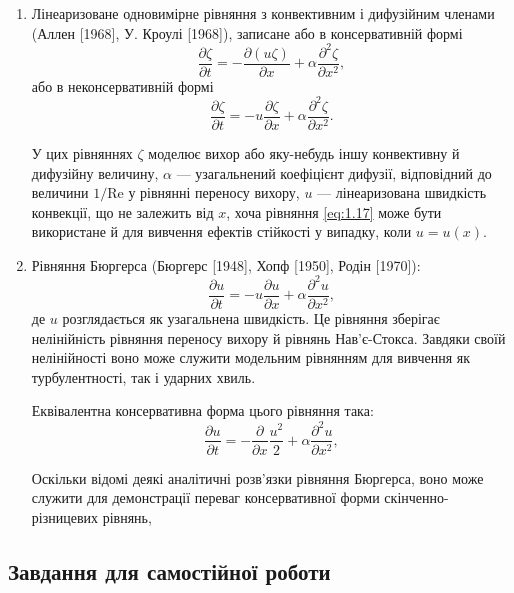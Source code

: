 \begin{enumerate}
    \item Лінеаризоване одновимірне рівняння з конвективним і дифузійним членами (Аллен [1968], У. Кроулі [1968]), записане або в консервативній формі
    \begin{equation}
        \label{eq:1.17}
        \frac{\partial \zeta}{\partial t} = - \frac{\partial (u \zeta)}{\partial x} + \alpha \frac{\partial^2 \zeta}{\partial x^2},
    \end{equation}
    або в неконсервативній формі
    \begin{equation}
        \label{eq:1.18}
        \frac{\partial \zeta}{\partial t} = - u \frac{\partial \zeta}{\partial x} + \alpha \frac{\partial^2 \zeta}{\partial x^2}.
    \end{equation}
    
    У цих рівняннях $\zeta$ моделює вихор або яку-небудь іншу конвективну й дифузійну величину, $\alpha$ --- узагальнений коефіцієнт дифузії, відповідний до величини $1/\text{Re}$ у рівнянні переносу вихору, $u$ --- лінеаризована швидкість конвекції, що не залежить від $x$, хоча рівняння \ref{eq:1.17} може бути використане й для вивчення ефектів стійкості у випадку, коли $u = u(x)$.

    \item Рівняння Бюргерса (Бюргерс [1948], Хопф [1950], Родін [1970]):
    \begin{equation}
        \label{eq:1.19}
        \frac{\partial u}{\partial t} = - u \frac{\partial u}{\partial x} + \alpha \frac{\partial^2 u}{\partial x^2},
    \end{equation}
    де $u$ розглядається як узагальнена швидкість. Це рівняння зберігає нелінійність рівняння переносу вихору й рівнянь Нав'є-Стокса. Завдяки своїй нелінійності воно може служити модельним рівнянням для вивчення як турбулентності, так і ударних хвиль. \medskip 

    Еквівалентна консервативна форма цього рівняння така:
    \begin{equation}
        \label{eq:1.20}
        \frac{\partial u}{\partial t} = - \frac{\partial}{\partial x} \frac{u^2}{2} + \alpha \frac{\partial^2 u}{\partial x^2},
    \end{equation}
    
    Оскільки відомі деякі аналітичні розв'язки рівняння Бюргерса, воно може служити для демонстрації переваг консервативної форми скінченно-різницевих рівнянь,
\end{enumerate}

\subsection{Завдання для самостійної роботи}


